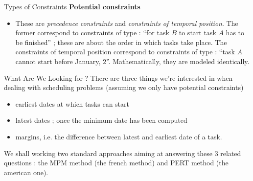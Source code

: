 \documentclass[32pt,aspectratio=169]{beamer}
\begin{document}
\begin{frame}{Types of Constraints}
  \textbf{Potential constraints}
  \begin{paremph}
    \begin{itemize}
    \item[] These are \emph{precedence constraints} and
      \emph{constraints of temporal position}. The former correspond
      to constraints of type : ``for task $B$ to start task $A$ has to
      be finished'' ; these are about the order
      in which tasks take place. The constraints of temporal position
      correspond to constraints of type : ``task $A$ cannot start
      before January, $2$''. Mathematically, they are modeled
      identically.
    \end{itemize}
  \end{paremph}
\end{frame}

\begin{frame}{What Are We Looking for ?}
  There are three things we're interested in when dealing with
  scheduling problems (assuming we only have potential constraints)
  \begin{itemize}
  \item<1-> earliest dates at which tasks can start
  \item<2-> latest dates ; once the minimum date has been computed
  \item<3-> margins, i.e. the difference between latest and earliest
    date of a task.
  \end{itemize}
  \pause[4]
  We shall working two standard approaches aiming at answering these
  $3$ related questions : the MPM method (the french method) and PERT
  method (the american one).
\end{frame}
\end{document}
